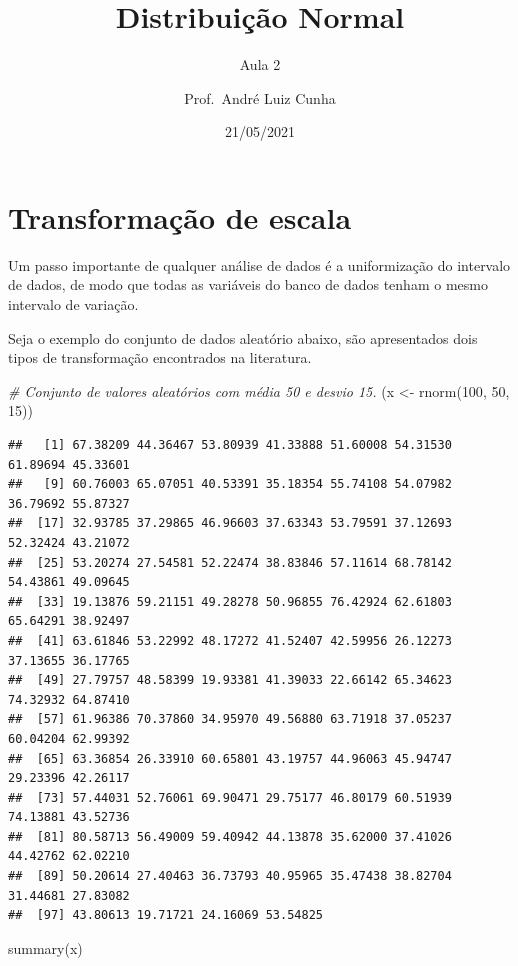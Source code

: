 \documentclass[
]{article}
\title{Distribuição Normal}
\subtitle{Aula 2}
\author{Prof.~André Luiz Cunha}
\date{21/05/2021}
\newenvironment{Shaded}{\begin{snugshade}}{\end{snugshade}}
\newcommand{\CommentTok}[1]{\textcolor[rgb]{0.56,0.35,0.01}{\textit{#1}}}
\newcommand{\DecValTok}[1]{\textcolor[rgb]{0.00,0.00,0.81}{#1}}
\newcommand{\FunctionTok}[1]{\textcolor[rgb]{0.00,0.00,0.00}{#1}}
\newcommand{\NormalTok}[1]{#1}
\newcommand{\OtherTok}[1]{\textcolor[rgb]{0.56,0.35,0.01}{#1}}
\begin{document}
\maketitle

\hypertarget{transformauxe7uxe3o-de-escala}{%
\section{Transformação de escala}\label{transformauxe7uxe3o-de-escala}}

Um passo importante de qualquer análise de dados é a uniformização do
intervalo de dados, de modo que todas as variáveis do banco de dados
tenham o mesmo intervalo de variação.

Seja o exemplo do conjunto de dados aleatório abaixo, são apresentados
dois tipos de transformação encontrados na literatura.

\begin{Shaded}
\begin{Highlighting}[]
\CommentTok{\# Conjunto de valores aleatórios com média 50 e desvio 15.}
\NormalTok{(x }\OtherTok{\textless{}{-}} \FunctionTok{rnorm}\NormalTok{(}\DecValTok{100}\NormalTok{, }\DecValTok{50}\NormalTok{, }\DecValTok{15}\NormalTok{))}
\end{Highlighting}
\end{Shaded}

\begin{verbatim}
##   [1] 67.38209 44.36467 53.80939 41.33888 51.60008 54.31530 61.89694 45.33601
##   [9] 60.76003 65.07051 40.53391 35.18354 55.74108 54.07982 36.79692 55.87327
##  [17] 32.93785 37.29865 46.96603 37.63343 53.79591 37.12693 52.32424 43.21072
##  [25] 53.20274 27.54581 52.22474 38.83846 57.11614 68.78142 54.43861 49.09645
##  [33] 19.13876 59.21151 49.28278 50.96855 76.42924 62.61803 65.64291 38.92497
##  [41] 63.61846 53.22992 48.17272 41.52407 42.59956 26.12273 37.13655 36.17765
##  [49] 27.79757 48.58399 19.93381 41.39033 22.66142 65.34623 74.32932 64.87410
##  [57] 61.96386 70.37860 34.95970 49.56880 63.71918 37.05237 60.04204 62.99392
##  [65] 63.36854 26.33910 60.65801 43.19757 44.96063 45.94747 29.23396 42.26117
##  [73] 57.44031 52.76061 69.90471 29.75177 46.80179 60.51939 74.13881 43.52736
##  [81] 80.58713 56.49009 59.40942 44.13878 35.62000 37.41026 44.42762 62.02210
##  [89] 50.20614 27.40463 36.73793 40.95965 35.47438 38.82704 31.44681 27.83082
##  [97] 43.80613 19.71721 24.16069 53.54825
\end{verbatim}

\begin{Shaded}
\begin{Highlighting}[]
\FunctionTok{summary}\NormalTok{(x)}
\end{Highlighting}
\end{Shaded}
\end{document}
